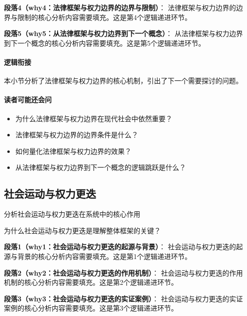 \documentclass[../main.tex]{subfiles}
\begin{document}
{{\textbf{段落4（why4：法律框架与权力边界的边界与限制）}：
法律框架与权力边界的边界与限制的核心分析内容需要填充。这是第4个逻辑递进环节。


\textbf{段落5（why5：从法律框架与权力边界到下一个概念）}：
从法律框架与权力边界到下一个概念的核心分析内容需要填充。这是第5个逻辑递进环节。


\paragraph*{逻辑衔接}
本小节分析了法律框架与权力边界的核心机制，引出了下一个需要探讨的问题。

\paragraph*{读者可能还会问}
\begin{itemize}
\item 为什么法律框架与权力边界在现代社会中依然重要？
\item 法律框架与权力边界的边界条件是什么？
\item 如何量化法律框架与权力边界的效果？
\item 从法律框架与权力边界到下一个概念的逻辑跳跃是什么？
\end{itemize}


\subsection{社会运动与权力更迭}

\begin{motivation}
分析社会运动与权力更迭在系统中的核心作用
\end{motivation}

\begin{logicmap}
[逻辑链占位]
\end{logicmap}

\begin{questionbox}
为什么社会运动与权力更迭是理解整体框架的关键？
\end{questionbox}

\textbf{段落1（why1：社会运动与权力更迭的起源与背景）}：
社会运动与权力更迭的起源与背景的核心分析内容需要填充。这是第1个逻辑递进环节。


\textbf{段落2（why2：社会运动与权力更迭的作用机制）}：
社会运动与权力更迭的作用机制的核心分析内容需要填充。这是第2个逻辑递进环节。


\textbf{段落3（why3：社会运动与权力更迭的实证案例）}：
社会运动与权力更迭的实证案例的核心分析内容需要填充。这是第3个逻辑递进环节。


}}
\end{document}
